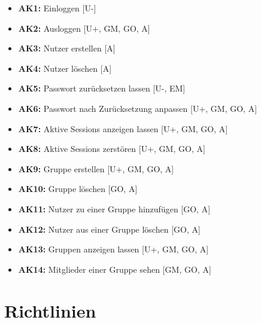 \documentclass[12pt,DIV14,BCOR10mm,a4paper,parskip=half-,english,ngerman,bibliography=totocnumbered]{scrreprt}
\begin{document}
\begin{itemize}
  \item \textbf{AK1:} Einloggen [U-]
  \item \textbf{AK2:} Ausloggen [U+, GM, GO, A]
  \item \textbf{AK3:} Nutzer erstellen [A]
  \item \textbf{AK4:} Nutzer löschen [A]
  \item \textbf{AK5:} Passwort zurücksetzen lassen [U-, EM]
  \item \textbf{AK6:} Passwort nach Zurücksetzung anpassen [U+, GM, GO, A]
  \item \textbf{AK7:} Aktive Sessions anzeigen lassen [U+, GM, GO, A]
  \item \textbf{AK8:} Aktive Sessions zerstören [U+, GM, GO, A]
  \item \textbf{AK9:} Gruppe erstellen [U+, GM, GO, A]
  \item \textbf{AK10:} Gruppe löschen [GO, A]
  \item \textbf{AK11:} Nutzer zu einer Gruppe hinzufügen [GO, A]
  \item \textbf{AK12:} Nutzer aus einer Gruppe löschen [GO, A]
  \item \textbf{AK13:} Gruppen anzeigen lassen [U+, GM, GO, A]
  \item \textbf{AK14:} Mitglieder einer Gruppe sehen [GM, GO, A]
\end{itemize}

\chapter{Richtlinien}

\end{document}
